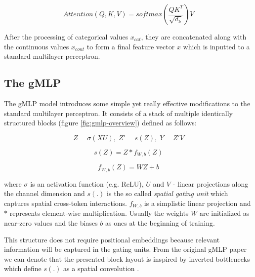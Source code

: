 \documentclass{article}
\begin{document}
\begin{equation}
    Attention(Q, K, V) = softmax(\frac{QK^T}{\sqrt{d_k}})V
\end{equation}

After the processing of categorical values $x_{cat}$, they are concatenated along with the continuous values $x_{cont}$ to form a final feature vector $x$ which is inputted to a standard  multilayer perceptron.

\subsection{The gMLP}
\label{sec:gmlp}

The gMLP model \cite{Liu2021PayAT} introduces some simple yet really effective modifications to the standard multilayer perceptron. It consists of a stack of multiple identically structured blocks (figure \ref{fig:gmlp-overview}) defined as follows:

\begin{equation}
    Z = \sigma(XU), \; Z' = s(Z), \; Y = Z'V
\end{equation}

\begin{equation}
    s(Z) = Z * f_{W,b}(Z)
\end{equation}

\begin{equation}
    f_{W,b}(Z) = WZ + b
\end{equation}

where $\sigma$ is an activation function (e.g. ReLU), $U$ and $V$ - linear projections along the channel dimension and $s(.)$ is the so called \textit{spatial gating unit} which captures spatial cross-token interactions. $f_{W,b}$ is a simplistic linear projection and $*$ represents element-wise multiplication. Usually the weights $W$ are initialized as near-zero values and the biases $b$ as ones at the beginning of training.

This structure does not require positional embeddings because relevant information will be captured in the gating units. From the original gMLP paper we can denote that the presented block layout is inspired by inverted bottlenecks which define $s(.)$ as a spatial convolution \cite{sandler2018mobilenetv2}.
\end{document}
